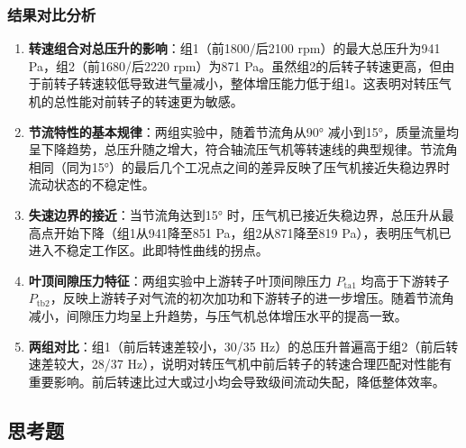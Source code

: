 \subsubsection{结果对比分析}

\begin{enumerate}
    \item \textbf{转速组合对总压升的影响}：组1（前1800/后2100 rpm）的最大总压升为941 Pa，组2（前1680/后2220 rpm）为871 Pa。虽然组2的后转子转速更高，但由于前转子转速较低导致进气量减小，整体增压能力低于组1。这表明对转压气机的总性能对前转子的转速更为敏感。

    \item \textbf{节流特性的基本规律}：两组实验中，随着节流角从90° 减小到15°，质量流量均呈下降趋势，总压升随之增大，符合轴流压气机等转速线的典型规律。节流角相同（同为15°）的最后几个工况点之间的差异反映了压气机接近失稳边界时流动状态的不稳定性。

    \item \textbf{失速边界的接近}：当节流角达到15° 时，压气机已接近失稳边界，总压升从最高点开始下降（组1从941降至851 Pa，组2从871降至819 Pa），表明压气机已进入不稳定工作区。此即特性曲线的拐点。

    \item \textbf{叶顶间隙压力特征}：两组实验中上游转子叶顶间隙压力 $P_{\text{ta1}}$ 均高于下游转子 $P_{\text{tb2}}$，反映上游转子对气流的初次加功和下游转子的进一步增压。随着节流角减小，间隙压力均呈上升趋势，与压气机总体增压水平的提高一致。

    \item \textbf{两组对比}：组1（前后转速差较小，30/35 Hz）的总压升普遍高于组2（前后转速差较大，28/37 Hz），说明对转压气机中前后转子的转速合理匹配对性能有重要影响。前后转速比过大或过小均会导致级间流动失配，降低整体效率。
\end{enumerate}

\subsection{思考题}

